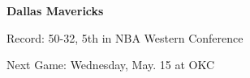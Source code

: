 \textbf{Dallas Mavericks}

Record: 50-32, 5th in NBA Western Conference

Next Game: Wednesday, May. 15 at OKC